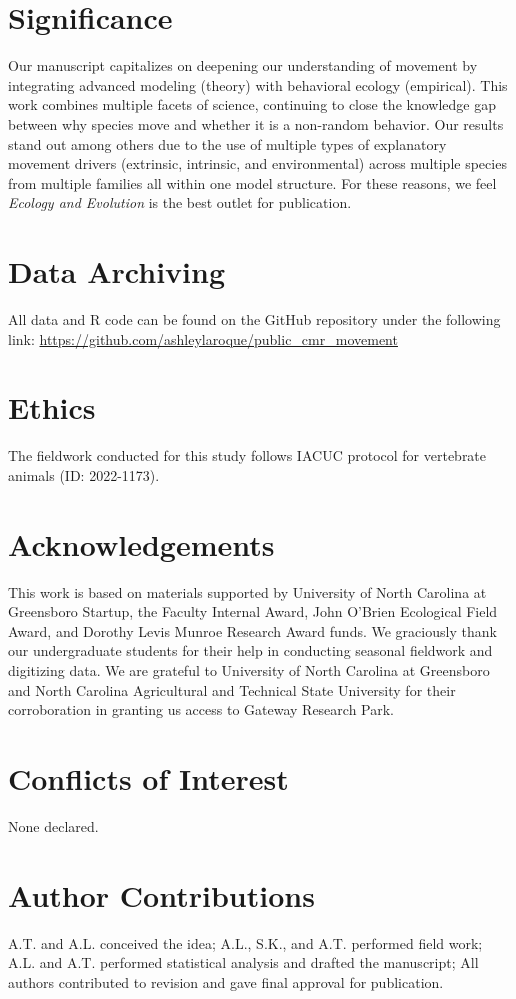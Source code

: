 \documentclass[11pt, class=article, crop=false]{standalone}
\date{}
\title{}
\begin{document}
\section*{Significance} %

Our manuscript capitalizes on deepening our understanding of movement by integrating advanced modeling (theory) with behavioral ecology (empirical). This work combines multiple facets of science, continuing to close the knowledge gap between why species move and whether it is a non-random behavior. Our results stand out among others due to the use of multiple types of explanatory movement drivers (extrinsic, intrinsic, and environmental) across multiple species from multiple families all within one model structure. For these reasons, we feel \textit{Ecology and Evolution} is the best outlet for publication. 

\section*{Data Archiving}

All data and R code can be found on the GitHub repository under the following link: \url{https://github.com/ashleylaroque/public_cmr_movement}

\section*{Ethics}

The fieldwork conducted for this study follows IACUC protocol for vertebrate animals (ID: 2022-1173).

\section*{Acknowledgements}

This work is based on materials supported by University of North Carolina at Greensboro Startup, the Faculty Internal Award, John O'Brien Ecological Field Award, and Dorothy Levis Munroe Research Award funds. We graciously thank our undergraduate students for their help in conducting seasonal fieldwork and digitizing data. We are grateful to University of North Carolina at Greensboro and North Carolina Agricultural and Technical State University for their corroboration in granting us access to Gateway Research Park. 

\section*{Conflicts of Interest}

None declared.

\section*{Author Contributions}

A.T. and A.L. conceived the idea; A.L., S.K., and A.T. performed  field work; A.L. and A.T. performed statistical analysis and drafted the manuscript; All authors contributed to revision and gave final approval for  publication.
\end{document}
